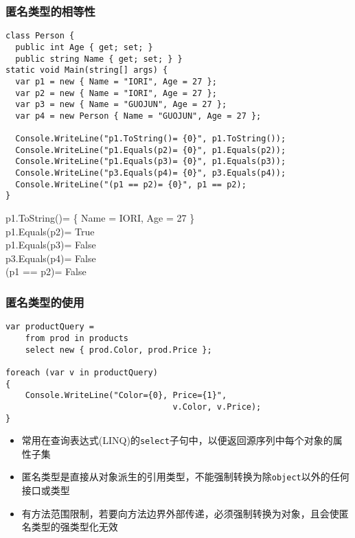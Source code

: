 \begin{frame}[fragile]
\frametitle{匿名类型的相等性}
\lstset{basicstyle=\ttfamily\scriptsize}
\begin{lstlisting}
class Person {
  public int Age { get; set; }
  public string Name { get; set; } }
static void Main(string[] args) {
  var p1 = new { Name = "IORI", Age = 27 };
  var p2 = new { Name = "IORI", Age = 27 };
  var p3 = new { Name = "GUOJUN", Age = 27 };
  var p4 = new Person { Name = "GUOJUN", Age = 27 };

  Console.WriteLine("p1.ToString()= {0}", p1.ToString());
  Console.WriteLine("p1.Equals(p2)= {0}", p1.Equals(p2));
  Console.WriteLine("p1.Equals(p3)= {0}", p1.Equals(p3));
  Console.WriteLine("p3.Equals(p4)= {0}", p3.Equals(p4));
  Console.WriteLine("(p1 == p2)= {0}", p1 == p2);
}
\end{lstlisting}
\scriptsize
p1.ToString()= \{ Name = IORI, Age = 27 \}\\
p1.Equals(p2)= True\\
p1.Equals(p3)= False\\
p3.Equals(p4)= False\\
(p1 == p2)= False\\
\end{frame}

\begin{frame}[fragile]
\frametitle{匿名类型的使用}
\begin{lstlisting}
var productQuery =
    from prod in products
    select new { prod.Color, prod.Price };

foreach (var v in productQuery)
{
    Console.WriteLine("Color={0}, Price={1}",
                                  v.Color, v.Price);
}
\end{lstlisting}
\begin{itemize}[<+->]
\item 常用在查询表达式(LINQ)的\texttt{select}子句中，以便返回源序列中每个对象的属性子集
\item 匿名类型是直接从对象派生的引用类型，不能强制转换为除\texttt{object}以外的任何接口或类型
\item 有方法范围限制，若要向方法边界外部传递，必须强制转换为对象，且会使匿名类型的强类型化无效
\end{itemize}
\end{frame}

